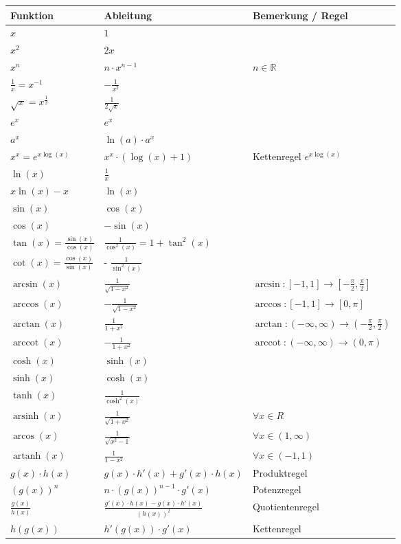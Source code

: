 \documentclass[25pt]{sciposter}
\newcommand{\R}{\mathbb{R}}
\begin{document}
\begin{multicols}{3}
{\renewcommand{\arraystretch}{1.5}
	\begin{table}[]
		\begin{tabular}{@{} p{} p{} p{} @{}}
			\toprule
			Funktion & Ableitung & Bemerkung / Regel\\ \midrule
			$x$ & $1$ &   \\
			$x^2$& $2x$ &   \\
			$x^n$& $n\cdot x^{n-1}$ & $n \in \R$  \\
			$\frac{1}{x} = x^{-1}$ & $- \frac{1}{x^2}$ & \\
			$\sqrt{x} = x^{\frac{1}{2}}$ & $\frac{1}{2\sqrt{x}}$ & \\ 
			$e^x$ & $e^x$ & \\
			$a^x$ & $\ln(a) \cdot a^x$& \\
			$x^x = e^{x\log(x)}$ & $x^x \cdot (\log(x) + 1)$ & Kettenregel $e^{x\log(x)}$\\
			$\ln(x)$ & $\frac{1}{x}$ & \\
			$x\ln(x) - x$ & $\ln(x)$ &  \\ \midrule
			$\sin(x)$ & $\cos(x)$ & \\
			$\cos(x)$ & $- \sin(x)$ & \\ 
			$\tan(x) = \frac{\sin(x)}{\cos(x)}$ & $\frac{1}{\cos^2(x)} = 1 + \tan^2(x)$ &\\
			$\cot(x) = \frac{\cos(x)}{\sin(x)}$ & - $\frac{1}{\sin^2(x)}$ & \\ 
			$\arcsin(x)$ & $\frac{1}{\sqrt{1 - x^2}}$ & $ \arcsin : [-1,1] \to [-\frac{\pi}{2},\frac{\pi}{2}]$\\
			$\arccos(x)$ & $ - \frac{1}{\sqrt{1-x^2}}$ & $\arccos : [-1,1] \to [0, \pi]$\\
			$\arctan(x)$ & $\frac{1}{1+x^2}$ & $\arctan:(-\infty, \infty) \to (- \frac{\pi}{2},\frac{\pi}{2})$\\
			$\operatorname{arccot}(x)$ & $ - \frac{1}{1+x^2} $ & $\operatorname{arccot} : (-\infty, \infty) \to (0,\pi)$\\
			\midrule
			$\cosh(x)$ & $\sinh(x)$ &\\
			$\sinh(x)$ & $\cosh(x)$ & \\
			$\tanh(x)$ & $\frac{1}{\cosh^2(x)}$ & \\
			$\operatorname{arsinh}(x)$ & $\frac{1}{\sqrt{1+x^2}}$ & $\forall x \in R$\\
			$\operatorname{arcos}(x)$ & $\frac{1}{\sqrt{x^2 - 1}}$ & $\forall x \in (1, \infty)$\\		  $\operatorname{artanh}(x)$ & $\frac{1}{1-x^2}$ & $\forall x \in (-1,1)$\\
			\midrule
			$g(x) \cdot h(x)$ & $g(x) \cdot h'(x) + g'(x) \cdot h(x)$ & Produktregel\\
			$\left(g(x)\right)^n$ & $n \cdot \left( g(x) \right)^{n-1} \cdot g'(x)$ & Potenzregel\\
			$\frac{g(x)}{h(x)}$ & $\frac{ g'(x) \cdot h(x) - g(x)\cdot h'(x)}{\left(h(x)\right) ^2}$ & Quotientenregel\\
			$h(g(x))$ & $h'(g(x)) \cdot g'(x)$ & Kettenregel\\
			\bottomrule
		\end{tabular}
	\end{table}
}

\newpage


\end{multicols}
\end{document}
